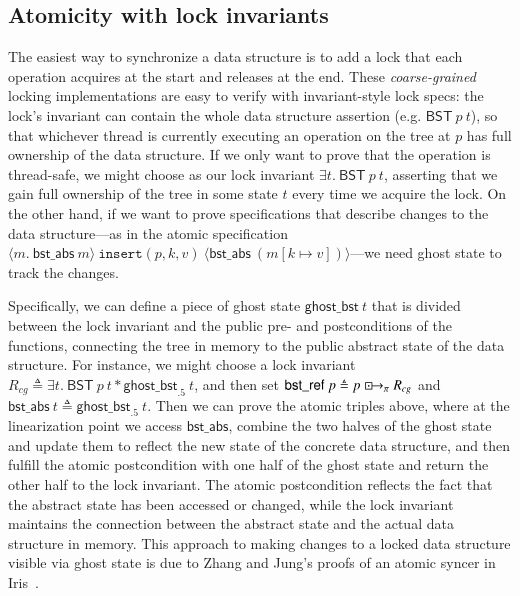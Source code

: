 \documentclass[runningheads]{llncs}
\newcommand{\islock}{\boxdotright}
\newcommand{\treerep}{\ensuremath{\mathsf{bst\_abs}}}
\newcommand{\nodeboxrep}{\ensuremath{\mathsf{bst\_ref}}}
\begin{document}
\subsection{Atomicity with lock invariants}
The easiest way to synchronize a data structure is to add a lock that each operation acquires at the start and releases at the end. These \emph{coarse-grained} locking implementations are easy to verify with invariant-style lock specs: the lock's invariant can contain the whole data structure assertion (e.g. $\mathsf{BST}\:p\ t$), so that whichever thread is currently executing an operation on the tree at $p$ has full ownership of the data structure. If we only want to prove that the operation is thread-safe, we might choose as our lock invariant $\exists t.\ \mathsf{BST}\ p\ t$, asserting that we gain full ownership of the tree in some state $t$ every time we acquire the lock. On the other hand, if we want to prove specifications that describe changes to the data structure---as in the atomic specification $\langle m.\ \treerep\ m\rangle\ \texttt{insert}(p, k, v)\ \langle \treerep\ (m[k \mapsto v])\rangle$---we need ghost state to track the changes.

Specifically, we can define a piece of ghost state $\mathsf{ghost\_bst}\ t$ that is divided between the lock invariant and the public pre- and postconditions of the functions, connecting the tree in memory to the public abstract state of the data structure. For instance, we might choose a lock invariant $R_{\mathit{cg}} \triangleq \exists t.\ \mathsf{BST}\ p\ t * \mathsf{ghost\_bst}_{.5}\ t$, and then set $\nodeboxrep\ p \triangleq p \islock_\pi R_{\mathit{cg}}$ and $\treerep\ t \triangleq \mathsf{ghost\_bst}_{.5}\ t$. %
Then we can prove the atomic triples above, where at the linearization point we access $\treerep$, combine the two halves of the ghost state and update them to reflect the new state of the concrete data structure, and then fulfill the atomic postcondition with one half of the ghost state and return the other half to the lock invariant. The atomic postcondition reflects the fact that the abstract state has been accessed or changed, while the lock invariant maintains the connection between the abstract state and the actual data structure in memory. This approach to making changes to a locked data structure visible via ghost state is due to Zhang and Jung's proofs of an atomic syncer in Iris~\cite{atomic-syncer}.%
\end{document}
